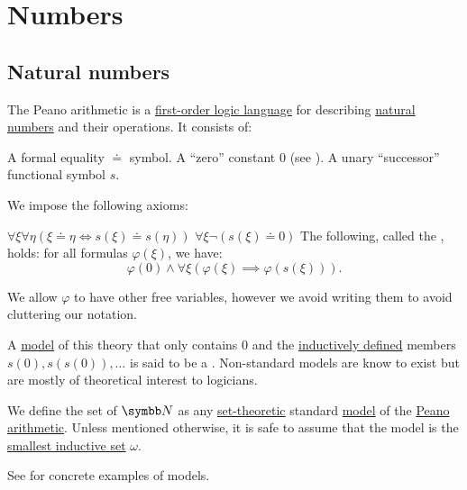 \section{Numbers}\label{sec:numbers}
\subsection{Natural numbers}\label{subsec:natural_numbers}

\begin{definition}\label{def:peano_arithmetic}
  The Peano arithmetic is a \hyperref[def:first_order_logic_alphabet]{first-order logic language} for describing \hyperref[def:natural_numbers]{natural numbers} and their operations. It consists of:
  \begin{DefEnum}
     A formal equality \( \doteq \) symbol.
     A \enquote{zero} constant \( 0 \) (see ).
     A unary \enquote{successor} functional symbol \( s \).
  \end{DefEnum}

  We impose the following axioms:
  \begin{DefEnum}
     \( \forall \xi \forall \eta (\xi \doteq \eta \iff s(\xi) \doteq s(\eta)) \)
     \( \forall \xi \neg (s(\xi) \doteq 0) \)
     The following, called the , holds: for all formulas \( \varphi(\xi) \), we have:
    \begin{equation*}
      \varphi(0) \wedge \forall \xi (\varphi(\xi) \implies \varphi(s(\xi))).
    \end{equation*}

    We allow \( \varphi \) to have other free variables, however we avoid writing them to avoid cluttering our notation.
  \end{DefEnum}

  A \hyperref[def:first_order_model]{model} of this theory that only contains \( 0 \) and the \hyperref[remark:induction]{inductively defined} members \( s(0), s(s(0)), \ldots \) is said to be a . Non-standard models are know to exist but are mostly of theoretical interest to logicians.
\end{definition}

\begin{definition}\label{def:natural_numbers}
  We define the set of  \( \BN \) as any \hyperref[sec:set_theory]{set-theoretic} standard \hyperref[def:first_order_model]{model} of the \hyperref[def:peano_arithmetic]{Peano arithmetic}. Unless mentioned otherwise, it is safe to assume that the model is the \hyperref[ex:natural_numbers_models/omega]{smallest inductive set} \( \omega \).

  See  for concrete examples of models.
\end{definition}

